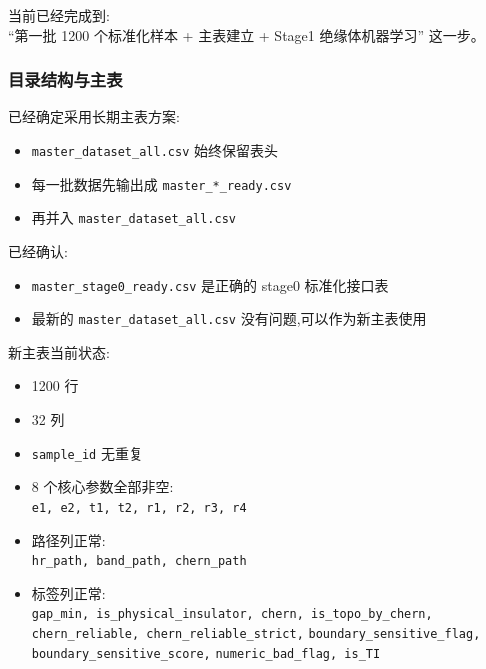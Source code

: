 \documentclass[lang=cn,scheme=chinese,color=blue,device=normal,toc=onecol,math=cm]{elegantbook}
\begin{document}
当前已经完成到:\\ “第一批 1200 个标准化样本 + 主表建立 + Stage1 绝缘体机器学习” 这一步。\par


\subsubsection{目录结构与主表}


已经确定采用长期主表方案:\par


\begin{itemize}
\item \texttt{master\_\allowbreak{}dataset\_\allowbreak{}all.csv} 始终保留表头
\item 每一批数据先输出成 \texttt{master\_\allowbreak{}*\_\allowbreak{}ready.csv}
\item 再并入 \texttt{master\_\allowbreak{}dataset\_\allowbreak{}all.csv}
\end{itemize}


已经确认:\par


\begin{itemize}
\item \texttt{master\_\allowbreak{}stage0\_\allowbreak{}ready.csv} 是正确的 stage0 标准化接口表
\item 最新的 \texttt{master\_\allowbreak{}dataset\_\allowbreak{}all.csv} 没有问题,可以作为新主表使用
\end{itemize}


新主表当前状态:\par


\begin{itemize}
\item 1200 行
\item 32 列
\item \texttt{sample\_\allowbreak{}id} 无重复
\item 8 个核心参数全部非空:\\ \texttt{e1, e2, t1, t2, r1, r2, r3, r4}
\item 路径列正常:\\ \texttt{hr\_\allowbreak{}path, band\_\allowbreak{}path, chern\_\allowbreak{}path}
\item 标签列正常:\\ \texttt{gap\_\allowbreak{}min, is\_\allowbreak{}physical\_\allowbreak{}insulator, chern, is\_\allowbreak{}topo\_\allowbreak{}by\_\allowbreak{}chern,} \texttt{chern\_\allowbreak{}reliable, chern\_\allowbreak{}reliable\_\allowbreak{}strict,} \texttt{boundary\_\allowbreak{}sensitive\_\allowbreak{}flag, boundary\_\allowbreak{}sensitive\_\allowbreak{}score,} \texttt{numeric\_\allowbreak{}bad\_\allowbreak{}flag, is\_\allowbreak{}TI}
\end{itemize}
\end{document}
